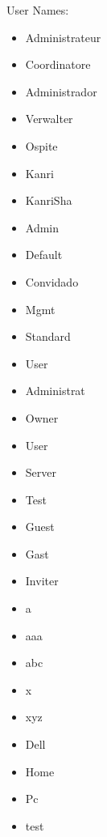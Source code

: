 User Names:

\begin{itemize}
\item Administrateur
\item Coordinatore
\item Administrador
\item Verwalter
\item Ospite
\item Kanri
\item KanriSha
\item Admin
\item Default
\item Convidado
\item Mgmt
\item Standard
\item User
\item Administrat
\item Owner
\item User
\item Server
\item Test
\item Guest
\item Gast
\item Inviter
\item a
\item aaa
\item abc
\item x
\item xyz
\item Dell
\item Home
\item Pc
\item test
\end{itemize}



